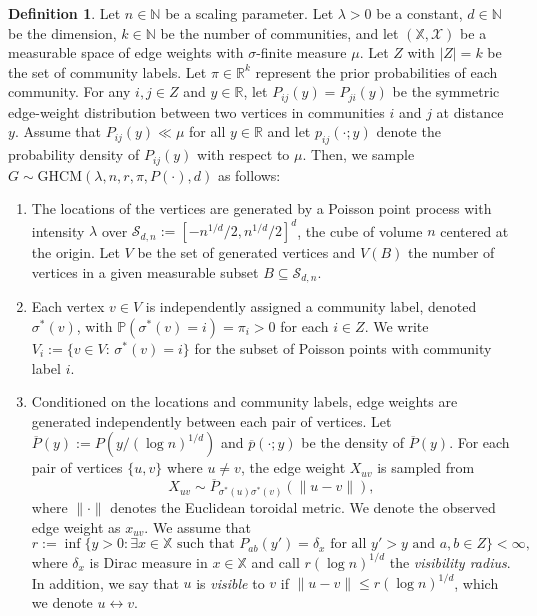 \documentclass[11pt, a4paper]{amsart}
\newcommand{\R}{\mathbb{R}}
\renewcommand{\P}{\mathbb{P}}
\newcommand{\N}{\mathbb{N}}
\newcommand{\1}{\mathbf{1}}
\newcommand{\visible}{\leftrightarrow{}}
\theoremstyle{definition}
\newtheorem{definition}[theorem]{Definition}
\theoremstyle{remark}
\theoremstyle{definition}
\begin{document}
 \begin{definition}
Let $n \in \N$ be a scaling parameter. Let $\lambda > 0$ be a constant, $d \in \N$ be the dimension, $k \in \N$ be the number of communities, and let $(\mathbb X, \mathcal X)$ be a measurable space of edge weights with $\sigma$-finite measure $\mu$. Let $Z$  with $|Z| = k$ be the set of community labels. Let $\pi \in \R^k$ represent the prior probabilities of each community. For any $i,j\in Z$ and $y\in \mathbb R$, let $P_{ij}(y)=P_{ji}(y)$ be the symmetric edge-weight distribution between two vertices in communities $i$ and $j$ at distance $y$. Assume that $P_{ij}(y) \ll \mu$ for all $y \in \R$ and let $p_{ij}(\cdot ; y)$ denote the probability density of $P_{ij}(y)$ with respect to $\mu$. Then, we sample $G \sim \text{GHCM}(\lambda, n, r, \pi, P(\cdot), d)$ as follows:
\begin{enumerate}
    \item The locations of the vertices are generated by a Poisson point process with intensity $\lambda$ over $\mathcal S_{d, n} := [-n^{1/d}/2, n^{1/d}/2]^d$, the cube of volume $n$ centered at the origin. Let $V$ be the set of generated vertices and $V(B)$ the number of vertices in a given measurable subset $B \subseteq \mathcal S_{d,n}$.
    
    \item Each vertex $v \in V$ is independently assigned a community label, denoted $\sigma^*(v)$, with $\P(\sigma^*(v) = i) = \pi_i > 0$ for each $i \in Z$. We write $V_i:=\{v \in V:\, \sigma^*(v)=i\}$ for the subset of Poisson points with community label $i$.
    
    \item Conditioned on the locations and community labels, edge weights are generated independently between each pair of vertices. Let $\overline{P}(y) := P(y/(\log n)^{1/d})$ and $\overline{p}(\cdot; y)$ be the density of $\overline{P}(y)$. For each pair of vertices $\{u, v\}$ where $u \neq v$, the edge weight $X_{uv}$ is sampled from
    \begin{equation*}
        X_{uv} \sim \overline{P}_{\sigma^*(u)\sigma^*(v) }(\|u-v\|),
    \end{equation*}
    where $\|\cdot\|$ denotes the Euclidean toroidal metric. We denote the observed edge weight as $x_{uv}$. We assume that 
    \[    r := \inf\{y > 0 : \exists x \in \mathbb X \text{ such that } P_{ab}(y') = \delta_x \text{ for all }  y' > y\text{ and } a,b \in Z\} < \infty,
    \] where $\delta_x$ is Dirac measure in $x \in \mathbb X$ and call $r (\log n)^{1/d}$ the \textit{visibility radius}. In addition, we say that $u$ is \textit{visible} to $v$ if $\|u - v\| \leq r (\log n)^{1/d}$, which we denote $u \visible v$. 
\end{enumerate}
\end{definition}
\end{document}

